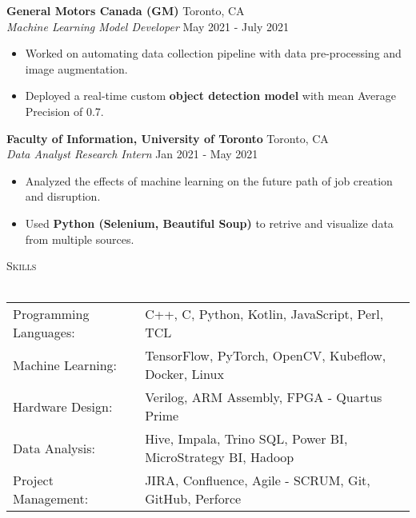 \documentclass[a4paper]{article}
\newcommand{\lineunder} {
    \vspace*{-8pt} \\
    \hspace*{-18pt} \hrulefill \\
}
\newcommand{\header} [1] {
    {\hspace*{-18pt}\vspace*{6pt} \textsc{#1}}
    \vspace*{-6pt} \lineunder
}
\begin{document}
\textbf{General Motors Canada (GM)} \hfill Toronto, CA\\
\textit{Machine Learning Model Developer} \hfill May 2021 - July 2021\\
\vspace{-1mm}
\begin{itemize} \itemsep 1pt
	\item Worked on automating data collection pipeline with data pre-processing and image augmentation.
	\item Deployed a real-time custom \textbf{object detection model} with mean Average Precision of 0.7.
\end{itemize}

\textbf{Faculty of Information, University of Toronto} \hfill Toronto, CA\\
\textit{Data Analyst Research Intern} \hfill Jan 2021 - May 2021\\
\vspace{-1mm}
\begin{itemize} \itemsep 1pt
    \item Analyzed the effects of machine learning on the future path of job creation and disruption.
	\item Used \textbf{Python (Selenium, Beautiful Soup)} to retrive and visualize data from multiple sources.
\end{itemize}


\header{Skills}
\begin{tabular}{ l l }
	Programming Languages: & C++, C, Python, Kotlin, JavaScript, Perl, TCL                    \\
	Machine Learning:      & TensorFlow, PyTorch, OpenCV, Kubeflow, Docker, Linux                     \\
    Hardware Design:       & Verilog, ARM Assembly, FPGA - Quartus Prime                             \\
	Data Analysis:         & Hive, Impala, Trino SQL, Power BI, MicroStrategy BI, Hadoop      \\
	Project Management:    & JIRA, Confluence, Agile - SCRUM, Git, GitHub, Perforce           \\                               
\end{tabular}
\vspace{2mm}
\end{document}

